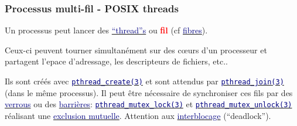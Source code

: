 \documentclass[lualatex,11pt,a4paper,svgnames,french]{beamer}
\newcommand{\clbhref}[2]{{\href{https:#1}{{\textcolor{Navy}{#2}}}}}
\newcommand{\clbman}[2]{{\href{https://man7.org/linux/man-pages/#1.html}{{\textcolor{Navy}{\texttt{#2}}}}}}
\newcommand{\clbrougras}[1]{{\textcolor{Red}{\textbf{#1}}}}
\begin{document}
\begin{frame}\frametitle{Processus multi-fil - POSIX threads}
  Un processus peut lancer des
  \clbhref{//fr.wikipedia.org/wiki/Thread\_(informatique)}{``thread''s}
  ou \clbrougras{fil} (cf
  \clbhref{//fr.wikipedia.org/wiki/Fibre\_(informatique)}{fibres}).

  \smallskip
  
Ceux-ci peuvent tourner simultanément sur des c{\oe}urs d'un
processeur et partagent l'epace d'adressage, les descripteurs de
fichiers, etc..

\smallskip
%
Ils sont créés avec
\clbman{man3/pthread_create.3}{pthread\_create(3)} et sont attendus par
\clbman{man3/pthread_join.3}{pthread\_join(3)} (dans le même processus).
%   
\smallskip
Il peut être nécessaire de synchroniser ces fils par des
\clbhref{https://fr.wikipedia.org/wiki/Verrou\_(informatique)}{verrous}
ou des
\clbhref{https://fr.wikipedia.org/wiki/Barrière\_de\_syncrhonisation}{barrières}: 
\clbman{man3/pthread_mutex_lock.3}{pthread\_mutex\_lock(3)} et
\clbman{man3/pthread_mutex_unlock.3}{pthread\_mutex\_unlock(3)}
réalisant une
\clbhref{https://fr.wikipedia.org/wiki/Exclusion\_mutuelle}{exclusion mutuelle}. Attention aux \clbhref{https://fr.wikipedia.org/wiki/Interblocage}{interblocage} (``deadlock'').

\end{frame}
\end{document}
